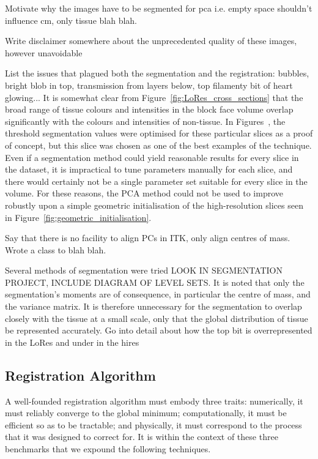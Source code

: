     Motivate why the images have to be segmented for pca i.e. empty space shouldn't influence cm, only tissue blah blah.
    
    Write disclaimer somewhere about the unprecedented quality of these images, however unavoidable 
    
    List the issues that plagued both the segmentation and the registration: bubbles, bright blob in top, transmission from layers below, top filamenty bit of heart glowing...
    It is somewhat clear from Figure~\ref{fig:LoRes_cross_sections} that the broad range of tissue colours and intensities in the block face volume overlap significantly with the colours and intensities of non-tissue. In Figures~, the threshold segmentation values were optimised for these particular slices as a proof of concept, but this slice was chosen as one of the best examples of the technique. Even if a segmentation method could yield reasonable results for every slice in the dataset, it is impractical to tune parameters manually for each slice, and there would certainly not be a single parameter set suitable for every slice in the volume. For these reasons, the PCA method could not be used to improve robustly upon a simple geometric initialisation of the high-resolution slices seen in Figure~\ref{fig:geometric_initialisation}.
    
    Say that there is no facility to align PCs in ITK, only align centres of mass. Wrote a class to blah blah.
    
    Several methods of segmentation were tried LOOK IN SEGMENTATION PROJECT, INCLUDE DIAGRAM OF LEVEL SETS. It is noted that only the segmentation's moments are of consequence, in particular the centre of mass, and the variance matrix. It is therefore unnecessary for the segmentation to overlap closely with the tissue at a small scale, only that the global distribution of tissue be represented accurately. Go into detail about how the top bit is overrepresented in the LoRes and under in the hires
        
   
  \subsection{Registration Algorithm} %
  \label{sub:registration_algorithm}
    A well-founded registration algorithm must embody three traits: numerically, it must reliably converge to the global minimum; computationally, it must be efficient so as to be tractable; and physically, it must correspond to the process that it was designed to correct for. It is within the context of these three benchmarks that we expound the following techniques.
    
